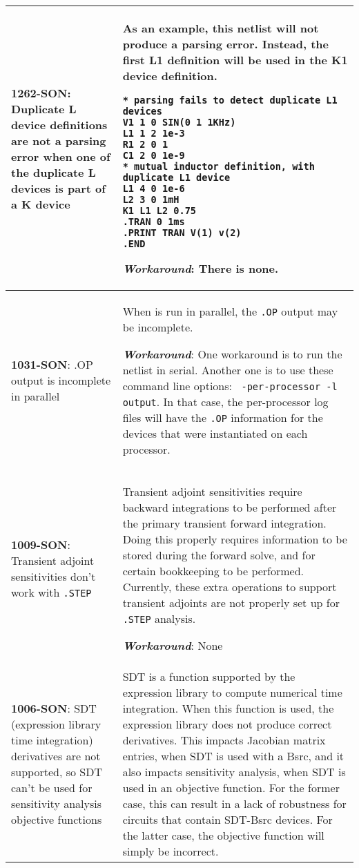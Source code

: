 {\begin{longtable}[h] {>{\raggedright\small}m{2in}|>{\raggedright\let\\\tabularnewline\small}m{3.5in}}
\textbf{1262-SON}: Duplicate L device definitions are not a parsing error
when one of the duplicate L devices is part of a K device &
As an example, this netlist will not produce a parsing error.  Instead,
the first L1 definition will be used in the K1 device definition.
\begin{verbatim}
* parsing fails to detect duplicate L1 devices
V1 1 0 SIN(0 1 1KHz)
L1 1 2 1e-3
R1 2 0 1
C1 2 0 1e-9
* mutual inductor definition, with duplicate L1 device
L1 4 0 1e-6
L2 3 0 1mH
K1 L1 L2 0.75
.TRAN 0 1ms
.PRINT TRAN V(1) v(2)
.END
\end{verbatim}

\textbf{\textit{Workaround}}:
There is none.
\\ \hline

\textbf{1031-SON}: .OP output is incomplete in parallel &
When \Xyce{} is run in parallel, the \texttt{.OP} output may be
incomplete.

\textbf{\textit{Workaround}}: One workaround is to run the netlist in
serial.  Another one is to use these command line options: \texttt{
-per-processor -l output}.  In that case, the per-processor log files
will have the \texttt{.OP} information for the devices that were
instantiated on each processor.
\\ \hline

  \textbf{1009-SON}: Transient adjoint sensitivities don't work
  with \texttt{.STEP} & Transient adjoint sensitivities require
  backward integrations to be performed after the primary transient
  forward integration.  Doing this properly requires information to be
  stored during the forward solve, and for certain bookkeeping to be
  performed.  Currently, these extra operations to support transient
  adjoints are not properly set up for \texttt{.STEP} analysis.

\textbf{\textit{Workaround}}: None
\\ \hline

\textbf{1006-SON}: SDT (expression library time integration)
  derivatives are not supported, so SDT can't be used for sensitivity
  analysis objective functions &
SDT is a function supported by the \Xyce{} expression library to
compute numerical time integration.  When this function is used, the
expression library does not produce correct derivatives.  This
impacts Jacobian matrix entries, when SDT is used with a Bsrc, and
it also impacts sensitivity analysis, when SDT is used in an
objective function.  For the former case, this can result in a lack
of robustness for circuits that contain SDT-Bsrc devices.  For the
latter case, the objective function will simply be incorrect.


\end{longtable}}
